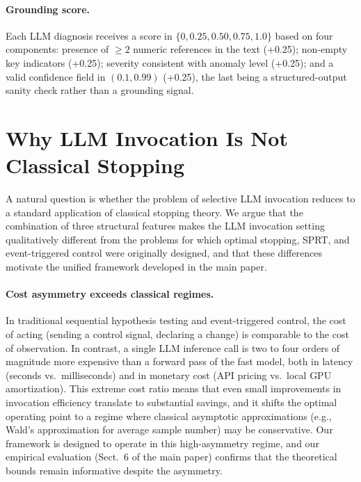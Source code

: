 \paragraph{Grounding score.}
Each LLM diagnosis receives a score in $\{0, 0.25, 0.50, 0.75, 1.0\}$ based on four components: presence of ${\ge}2$ numeric references in the text (+0.25); non-empty key indicators (+0.25); severity consistent with anomaly level (+0.25); and a valid confidence field in $(0.1, 0.99)$ (+0.25), the last being a structured-output sanity check rather than a grounding signal.

\section{Why LLM Invocation Is Not Classical Stopping}
\label{app:novelty}

A natural question is whether the problem of selective LLM invocation reduces to a standard application of classical stopping theory.
We argue that the combination of three structural features makes the LLM invocation setting qualitatively different from the problems for which optimal stopping, SPRT, and event-triggered control were originally designed, and that these differences motivate the unified framework developed in the main paper.

\paragraph{Cost asymmetry exceeds classical regimes.}
In traditional sequential hypothesis testing and event-triggered control, the cost of acting (sending a control signal, declaring a change) is comparable to the cost of observation.
In contrast, a single LLM inference call is two to four orders of magnitude more expensive than a forward pass of the fast model, both in latency (seconds vs.\ milliseconds) and in monetary cost (API pricing vs.\ local GPU amortization).
This extreme cost ratio means that even small improvements in invocation efficiency translate to substantial savings, and it shifts the optimal operating point to a regime where classical asymptotic approximations (e.g., Wald's approximation for average sample number) may be conservative.
Our framework is designed to operate in this high-asymmetry regime, and our empirical evaluation (Sect.~6 of the main paper) confirms that the theoretical bounds remain informative despite the asymmetry.

